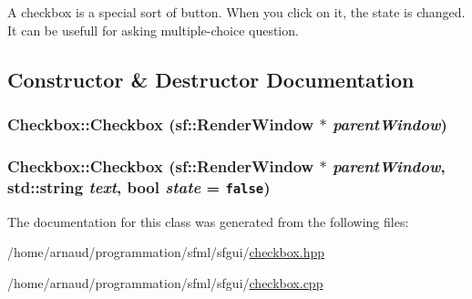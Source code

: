 A checkbox is a special sort of button. When you click on it, the state is changed. It can be usefull for asking multiple-choice question. 

\subsection{Constructor \& Destructor Documentation}
\hypertarget{classCheckbox_52fb2f9dc8a59b60743f7b6cdb829d53}{
\subsubsection[Checkbox]{\setlength{\rightskip}{0pt plus 5cm}Checkbox::Checkbox (sf::RenderWindow $\ast$ {\em parentWindow})}}
\label{classCheckbox_52fb2f9dc8a59b60743f7b6cdb829d53}


\hypertarget{classCheckbox_4fca8d4a179ac49675fcdde1354a433c}{
\subsubsection[Checkbox]{\setlength{\rightskip}{0pt plus 5cm}Checkbox::Checkbox (sf::RenderWindow $\ast$ {\em parentWindow}, \/  std::string {\em text}, \/  bool {\em state} = {\tt false})}}
\label{classCheckbox_4fca8d4a179ac49675fcdde1354a433c}




The documentation for this class was generated from the following files:\begin{CompactItemize}
\item 
/home/arnaud/programmation/sfml/sfgui/\hyperlink{checkbox_8hpp}{checkbox.hpp}\item 
/home/arnaud/programmation/sfml/sfgui/\hyperlink{checkbox_8cpp}{checkbox.cpp}\end{CompactItemize}
